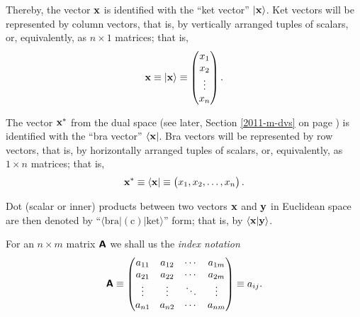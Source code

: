 Thereby,
the vector ${\bf x}$ is identified with the ``ket vector'' $\vert {\bf x}\rangle$.
Ket vectors will be represented by column vectors, that is, by vertically arranged tuples of scalars,
or, equivalently, as $n \times 1$ matrices; that is,
\begin{equation}
{\bf x}
\equiv
\vert {\bf x}\rangle
\equiv
\begin{pmatrix}
x_1\\
x_2\\
\vdots \\
x_n
\end{pmatrix}
.
\end{equation}


The vector ${\bf x}^\ast$  from the dual space (see later, Section \ref{2011-m-dvs} on page \pageref{2011-m-dvs})
 is identified with the ``bra vector'' $\langle {\bf x}\vert$.
Bra vectors will be represented by row vectors, that is, by horizontally arranged tuples of scalars,
or, equivalently, as $1 \times n$ matrices; that is,
\begin{equation}
{\bf x}^\ast
\equiv
\langle {\bf x}   \vert
\equiv
\begin{pmatrix}
x_1,
x_2,
\ldots ,
x_n
\end{pmatrix}
.
\end{equation}



Dot (scalar or inner) products between two vectors ${\bf x}$ and ${\bf y}$   in Euclidean space are then
denoted by ``$\langle \textrm{bra} \vert  (\textrm{c}) \vert \textrm{ket}  \rangle$''  form;
that is, by $\langle {\bf x} \vert  {\bf y}  \rangle$.




For an $n \times m$ matrix $\textsf{\textbf{A}}$ we shall us the {\em index notation}
\begin{equation}
\textsf{\textbf{A}}
\equiv
\begin{pmatrix}
a_{11}&a_{12}& \cdots & a_{1m}\\
a_{21}&a_{22}& \cdots & a_{2m}\\
\vdots &\vdots & \ddots & \vdots \\
a_{n1}&a_{n2}& \cdots & a_{nm}
\end{pmatrix}
\equiv a_{ij}
.
\end{equation}

